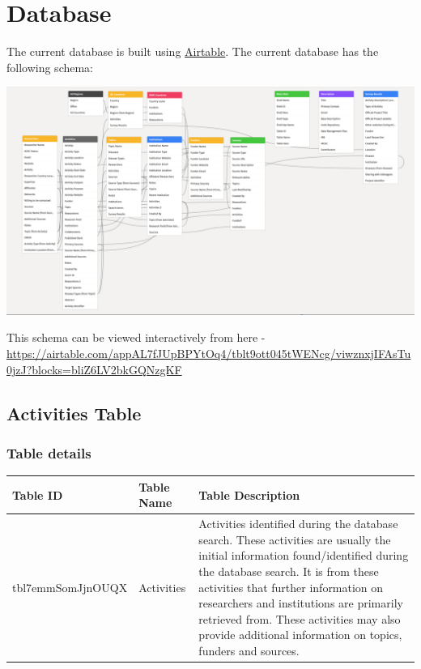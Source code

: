 \documentclass[
]{book}
\begin{document}
\hypertarget{database}{%
\chapter{Database}\label{database}}

The current database is built using \href{https://airtable.com}{Airtable}. The current database has the following schema:

\includegraphics{images/database_schema.png}

This schema can be viewed interactively from here - \url{https://airtable.com/appAL7fJUpBPYtOq4/tblt9ott045tWENcg/viwznxjIFAsTu0jzJ?blocks=bliZ6LV2bkGQNzgKF}

\hypertarget{activities-table}{%
\section{Activities Table}\label{activities-table}}

\hypertarget{table-details}{%
\subsection{Table details}\label{table-details}}

\begin{table}
\centering
\begin{tabular}{l|l|l}
\hline
\textbf{Table ID} & \textbf{Table Name} & \textbf{Table Description}\\
\hline
tbl7emmSomJjnOUQX & Activities & Activities identified during the database search. These activities are usually the initial information found/identified during the database search. It is from these activities that further information on researchers and institutions are primarily retrieved from. These activities may also provide additional information on topics, funders and sources.\\
\hline
\end{tabular}
\end{table}
\end{document}
